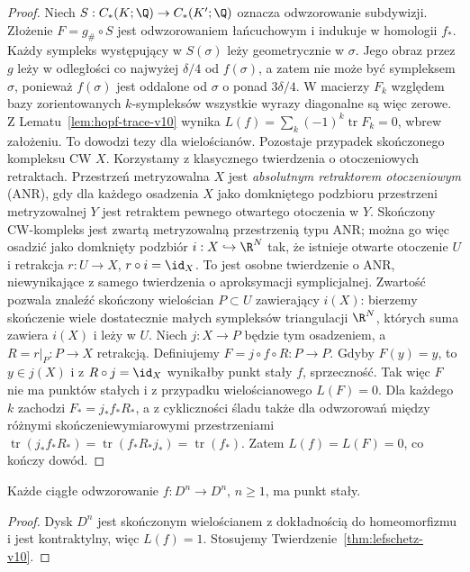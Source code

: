\begin{proof}
Niech $S:C_*(K;\Q)\to C_*(K';\Q)$ oznacza odwzorowanie
subdywizji. Złożenie $F=g_\#\circ S$ jest
odwzorowaniem łańcuchowym i indukuje w homologii
$f_*$. Każdy sympleks występujący w $S(\sigma)$
leży geometrycznie w $\sigma$. Jego obraz przez $g$
leży w odległości co najwyżej $\delta/4$ od
$f(\sigma)$, a zatem nie może być sympleksem $\sigma$,
ponieważ $f(\sigma)$ jest oddalone od $\sigma$
o ponad $3\delta/4$. W macierzy $F_k$ względem
bazy zorientowanych $k$-sympleksów wszystkie wyrazy
diagonalne są więc zerowe. Z Lematu~\ref{lem:hopf-trace-v10}
wynika $L(f)=\sum_k(-1)^k\operatorname{tr}F_k=0$,
wbrew założeniu. To dowodzi tezy dla wielościanów.
Pozostaje przypadek skończonego kompleksu CW $X$.
Korzystamy z klasycznego twierdzenia o otoczeniowych
retraktach. Przestrzeń metryzowalna $X$ jest \emph{absolutnym
retraktorem otoczeniowym} (ANR), gdy dla każdego
osadzenia $X$ jako domkniętego podzbioru przestrzeni
metryzowalnej $Y$ jest retraktem pewnego otwartego
otoczenia w $Y$. Skończony CW-kompleks jest zwartą
metryzowalną przestrzenią typu ANR; można go więc osadzić
jako domknięty podzbiór $i:X\hookrightarrow\R^N$
tak, że istnieje otwarte otoczenie $U$ i retrakcja
$r:U\to X$, $r\circ i=\id_X$. To jest osobne twierdzenie
o ANR, niewynikające z samego twierdzenia o aproksymacji
symplicjalnej.
Zwartość pozwala znaleźć skończony wielościan
$P\subset U$ zawierający $i(X)$: bierzemy skończenie
wiele dostatecznie małych sympleksów triangulacji
$\R^N$, których suma zawiera $i(X)$ i leży w $U$.
Niech $j:X\to P$ będzie tym osadzeniem, a
$R=r|_P:P\to X$ retrakcją. Definiujemy
$F=j\circ f\circ R:P\to P$.
Gdyby $F(y)=y$, to $y\in j(X)$ i z $R\circ j=\id_X$
wynikałby punkt stały $f$, sprzeczność.
Tak więc $F$ nie ma punktów stałych i z przypadku
wielościanowego $L(F)=0$.
Dla każdego $k$ zachodzi $F_*=j_* f_*R_*$,
a z cykliczności śladu także dla odwzorowań między różnymi
skończeniewymiarowymi przestrzeniami
$\operatorname{tr}(j_*f_*R_*)=
\operatorname{tr}(f_*R_*j_*)=\operatorname{tr}(f_*)$.
Zatem $L(f)=L(F)=0$, co kończy dowód.
\end{proof}

\begin{wniosek}
Każde ciągłe odwzorowanie $f:D^n\to D^n$, $n\ge1$,
ma punkt stały.
\end{wniosek}
\begin{proof}
Dysk $D^n$ jest skończonym wielościanem z dokładnością
do homeomorfizmu i jest kontraktylny, więc
$L(f)=1$. Stosujemy Twierdzenie~\ref{thm:lefschetz-v10}.
\end{proof}


